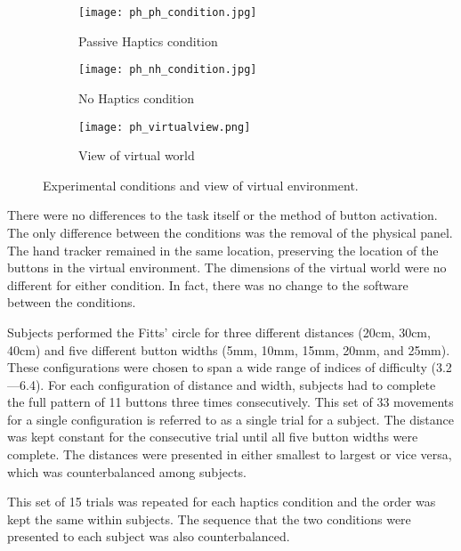 \begin{figure}
    \centering
    \begin{subfigure}[t]{0.32\linewidth}
        \centering
        \texttt{[image: ph\_ph\_condition.jpg]}
        \caption{Passive Haptics condition}
        \label{fig:ph_conditions:ph_condition}
    \end{subfigure}
    \begin{subfigure}[t]{0.32\linewidth}
        \centering
        \texttt{[image: ph\_nh\_condition.jpg]}
        \caption{No Haptics condition}
        \label{fig:ph_conditions:nh_condition}
    \end{subfigure}
    \begin{subfigure}[t]{0.32\linewidth}
        \centering
        \texttt{[image: ph\_virtualview.png]}
        \caption{View of virtual world}
        \label{fig:ph_conditions:virtual}
    \end{subfigure}
    \caption{Experimental conditions and view of virtual environment.}
    \label{fig:ph_conditions}
\end{figure}

There were no differences to the task itself or the method of button activation.
The only difference between the conditions was the removal of the physical panel.
The hand tracker remained in the same location, preserving the location of the buttons in the virtual environment.
The dimensions of the virtual world were no different for either condition.
In fact, there was no change to the software between the conditions.

Subjects performed the Fitts' circle for three different distances (20cm, 30cm, 40cm) and five different button widths (5mm, 10mm, 15mm, 20mm, and 25mm).
These configurations were chosen to span a wide range of indices of difficulty (3.2---6.4).
For each configuration of distance and width, subjects had to complete the full pattern of 11 buttons three times consecutively.
This set of 33 movements for a single configuration is referred to as a single trial for a subject.
The distance was kept constant for the consecutive trial until all five button widths were complete.
The distances were presented in either smallest to largest or vice versa, which was counterbalanced among subjects.

This set of 15 trials was repeated for each haptics condition and the order was kept the same within subjects.
The sequence that the two conditions were presented to each subject was also counterbalanced.

